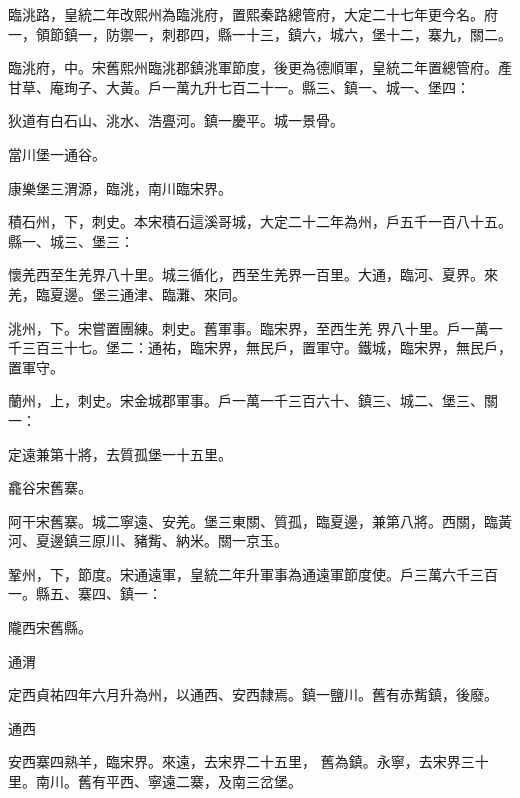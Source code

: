\begin{pinyinscope}
 臨洮路，皇統二年改熙州為臨洮府，置熙秦路總管府，大定二十七年更今名。府一，領節鎮一，防禦一，刺郡四，縣一十三，鎮六，城六，堡十二，寨九，關二。



 臨洮府，中。宋舊熙州臨洮郡鎮洮軍節度，後更為德順軍，皇統二年置總管府。產甘草、庵珣子、大黃。戶一萬九升七百二十一。縣三、鎮一、城一、堡四：



 狄道有白石山、洮水、浩亹河。鎮一慶平。城一景骨。



 當川堡一通谷。



 康樂堡三渭源，臨洮，南川臨宋界。



 積石州，下，刺史。本宋積石這溪哥城，大定二十二年為州，戶五千一百八十五。縣一、城三、堡三：



 懷羌西至生羌界八十里。城三循化，西至生羌界一百里。大通，臨河、夏界。來羌，臨夏邊。堡三通津、臨灘、來同。



 洮州，下。宋嘗置團練。刺史。舊軍事。臨宋界，至西生羌
 界八十里。戶一萬一千三百三十七。堡二：通祐，臨宋界，無民戶，置軍守。鐵城，臨宋界，無民戶，置軍守。



 蘭州，上，刺史。宋金城郡軍事。戶一萬一千三百六十、鎮三、城二、堡三、關一：



 定遠兼第十將，去質孤堡一十五里。



 龕谷宋舊寨。



 阿干宋舊寨。城二寧遠、安羌。堡三東關、質孤，臨夏邊，兼第八將。西關，臨黃河、夏邊鎮三原川、豬觜、納米。關一京玉。



 鞏州，下，節度。宋通遠軍，皇統二年升軍事為通遠軍節度使。戶三萬六千三百一。縣五、寨四、鎮一：



 隴西宋舊縣。



 通渭



 定西貞祐四年六月升為州，以通西、安西隸焉。鎮一鹽川。舊有赤觜鎮，後廢。



 通西



 安西寨四熟羊，臨宋界。來遠，去宋界二十五里，
 舊為鎮。永寧，去宋界三十里。南川。舊有平西、寧遠二寨，及南三岔堡。




\end{pinyinscope}
